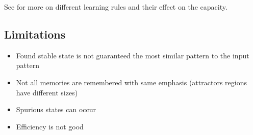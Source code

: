 
See \cite{Storkey1997} for more on different learning rules and their effect on the capacity.

\subsection{Limitations}
\begin{itemize}
\item Found stable state is not guaranteed the most similar pattern to the input pattern
\item Not all memories are remembered with same emphasis (attractors regions have different sizes)
\item Spurious states can occur
\item Efficiency is not good
\end{itemize}